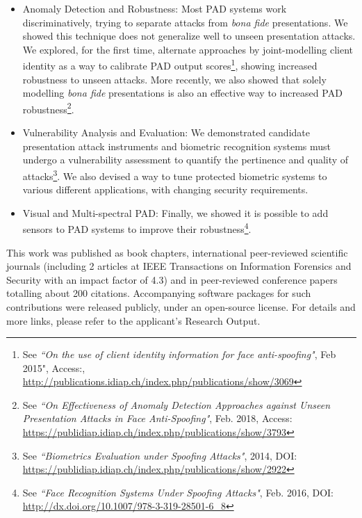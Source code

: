 \documentclass[a4paper,10pt,onecolumn]{article}
\begin{document}
\begin{itemize}

  \item Anomaly Detection and Robustness: Most PAD systems work
    discriminatively, trying to separate attacks from \textit{bona fide}
    presentations.  We showed this technique does not generalize well to unseen
    presentation attacks.  We explored, for the first time, alternate
    approaches by joint-modelling client identity as a way to calibrate PAD
    output scores\footnote{See \textit{``On the use of client identity
    information for face anti-spoofing"}, Feb 2015", Access:,
    \url{http://publications.idiap.ch/index.php/publications/show/3069}},
    showing increased robustness to unseen attacks.  More recently, we also
    showed that solely modelling \textit{bona fide} presentations is also an
    effective way to increased PAD robustness\footnote{See \textit{``On
    Effectiveness of Anomaly Detection Approaches against Unseen Presentation
    Attacks in Face Anti-Spoofing"}, Feb. 2018, Access:
    \url{https://publidiap.idiap.ch/index.php/publications/show/3793}}.

  \item Vulnerability Analysis and Evaluation: We demonstrated candidate
    presentation attack instruments and biometric recognition systems must
    undergo a vulnerability assessment to quantify the pertinence and quality
    of attacks\footnote{See \textit{``Biometrics Evaluation under Spoofing
    Attacks"}, 2014, DOI:
    \url{https://publidiap.idiap.ch/index.php/publications/show/2922}}.  We
    also devised a way to tune protected biometric systems to various different
    applications, with changing security requirements.

  \item Visual and Multi-spectral PAD: Finally, we showed it is possible to
    add sensors to PAD systems to improve their robustness\footnote{See
    \textit{``Face Recognition Systems Under Spoofing Attacks"}, Feb. 2016, DOI:
    \url{http://dx.doi.org/10.1007/978-3-319-28501-6_8}}.

\end{itemize}

This work was published as book chapters, international peer-reviewed
scientific journals (including 2 articles at IEEE Transactions on Information
Forensics and Security with an impact factor of 4.3) and in peer-reviewed
conference papers totalling about 200 citations.  Accompanying software
packages for such contributions were released publicly, under an open-source
license. For details and more links, please refer to the applicant's Research
Output.
\end{document}
